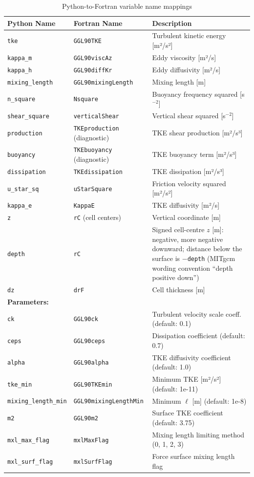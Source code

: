 \documentclass[11pt]{article}
\begin{document}
\begin{table}[h]
\centering
\small
\begin{tabular}{llp{5cm}}
\toprule
\textbf{Python Name} & \textbf{Fortran Name} & \textbf{Description} \\
\midrule
\verb|tke| & \verb|GGL90TKE| & Turbulent kinetic energy [m²/s²] \\
\verb|kappa_m| & \verb|GGL90viscAz| & Eddy viscosity [m²/s] \\
\verb|kappa_h| & \verb|GGL90diffKr| & Eddy diffusivity [m²/s] \\
\verb|mixing_length| & \verb|GGL90mixingLength| & Mixing length [m] \\
\verb|n_square| & \verb|Nsquare| & Buoyancy frequency squared [s$^{-2}$] \\
\verb|shear_square| & \verb|verticalShear| & Vertical shear squared [s$^{-2}$] \\
\verb|production| & \verb|TKEproduction| (diagnostic) & TKE shear production [m²/s³] \\
\verb|buoyancy| & \verb|TKEbuoyancy| (diagnostic) & TKE buoyancy term [m²/s³] \\
\verb|dissipation| & \verb|TKEdissipation| & TKE dissipation [m²/s³] \\
\verb|u_star_sq| & \verb|uStarSquare| & Friction velocity squared [m²/s²] \\
\verb|kappa_e| & \verb|KappaE| & TKE diffusivity [m²/s] \\
\verb|z| & \verb|rC| (cell centers) & Vertical coordinate [m] \\
\verb|depth| & \verb|rC| & Signed cell-centre $z$ [m]: negative, more negative downward; distance below the surface is $-$\verb|depth| (MITgcm wording convention ``depth positive down'') \\
\verb|dz| & \verb|drF| & Cell thickness [m] \\
\midrule
\multicolumn{3}{l}{\textbf{Parameters:}} \\
\verb|ck| & \verb|GGL90ck| & Turbulent velocity scale coeff. (default: 0.1) \\
\verb|ceps| & \verb|GGL90ceps| & Dissipation coefficient (default: 0.7) \\
\verb|alpha| & \verb|GGL90alpha| & TKE diffusivity coefficient (default: 1.0) \\
\verb|tke_min| & \verb|GGL90TKEmin| & Minimum TKE [m²/s²] (default: 1e-11) \\
\verb|mixing_length_min| & \verb|GGL90mixingLengthMin| & Minimum $\ell$ [m] (default: 1e-8) \\
\verb|m2| & \verb|GGL90m2| & Surface TKE coefficient (default: 3.75) \\
\verb|mxl_max_flag| & \verb|mxlMaxFlag| & Mixing length limiting method (0, 1, 2, 3) \\
\verb|mxl_surf_flag| & \verb|mxlSurfFlag| & Force surface mixing length flag \\
\bottomrule
\end{tabular}
\caption{Python-to-Fortran variable name mappings}
\end{table}
\end{document}
